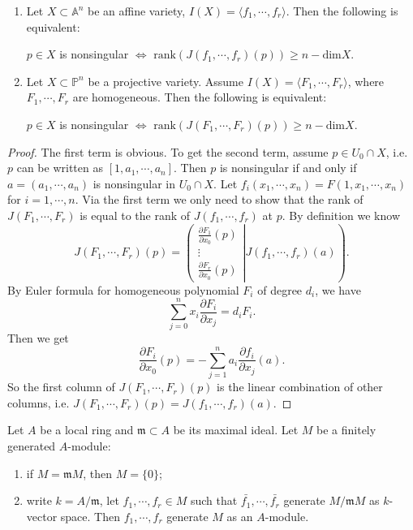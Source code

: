 \begin{corollary}
  {}
  \noindent
	\begin{enumerate}
		\item Let $ X\subset\mathbb{A}^n $ be an affine variety, $ I(X)=\langle f_1,\cdots,f_r\rangle $. Then the following is equivalent:
		      \begin{center}
			      $ p\in X $ is nonsingular $ \Leftrightarrow $ $ \mathrm{rank}(J(f_1,\cdots,f_r)(p))\geq n-\mathrm{dim}X $.
		      \end{center}
		\item Let $ X\subset\mathbb{P}^n $ be a projective variety. Assume $ I(X)=\langle F_1,\cdots,F_r\rangle $, where $ F_1,\cdots,F_r $ are homogeneous. Then the following is equivalent:
		      \begin{center}
			      $ p\in X $ is nonsingular $ \Leftrightarrow $ $ \mathrm{rank}(J(F_1,\cdots,F_r)(p))\geq n-\mathrm{dim}X $.
		      \end{center}
	\end{enumerate}
\end{corollary}
\begin{proof}
	The first  term is obvious. To get the second term, assume $ p\in U_0\cap X $, i.e. $ p $ can be written as $ [1,a_1,\cdots,a_n] $. Then $ p $ is nonsingular if and only if $ a=(a_1,\cdots,a_n) $ is nonsingular in $ U_0\cap X $. Let $ f_i(x_1,\cdots,x_n)=F(1,x_1,\cdots,x_n) $ for $ i=1,\cdots,n $. Via the first term we only need to show that the rank of $ J(F_1,\cdots,F_r) $ is equal to the rank of $ J(f_1,\cdots,f_r) $ at $ p $. By definition we know
	$$
		J(F_1,\cdots,F_r)(p)=\left( \left.\begin{matrix}
			\frac{\partial F_1}{\partial x_0}(p) \\
			\vdots                               \\
			\frac{\partial F_r}{\partial x_0}(p)
		\end{matrix}\right| J(f_1,\cdots,f_r)(a) \right).
	$$
	By Euler formula for homogeneous polynomial $ F_i $ of degree $ d_i $, we have
	$$
		\sum\limits_{j=0}^n x_i\frac{\partial F_i}{\partial x_j}= d_iF_i.
	$$
	Then we get
	$$
		\frac{\partial F_i}{\partial x_0}(p)=-\sum\limits_{j=1}^n a_i\frac{\partial f_i}{\partial x_j}(a).
	$$
	So the first column of $ J(F_1,\cdots,F_r)(p) $ is the linear combination of other columns, i.e. $ J(F_1,\cdots,F_r)(p)=J(f_1,\cdots,f_r)(a) $.
\end{proof}
\begin{lemma}[Nakayama]
	Let $ A $ be a local ring and $ \mathfrak{m}\subset A $ be its maximal ideal. Let $ M $ be a finitely generated $ A $-module:
	\begin{enumerate}
		\item if $ M=\mathfrak{m}M $, then $ M=\lbrace 0 \rbrace $;
		\item write $ k=A/\mathfrak{m} $, let $ f_1,\cdots,f_r\in M $ such that $ \bar{f_1},\cdots,\bar{f_r} $ generate $ M/\mathfrak{m}M $ as $ k $-vector space. Then $ f_1,\cdots,f_r $ generate $ M $ as an  $ A $-module.
	\end{enumerate}
\end{lemma}
